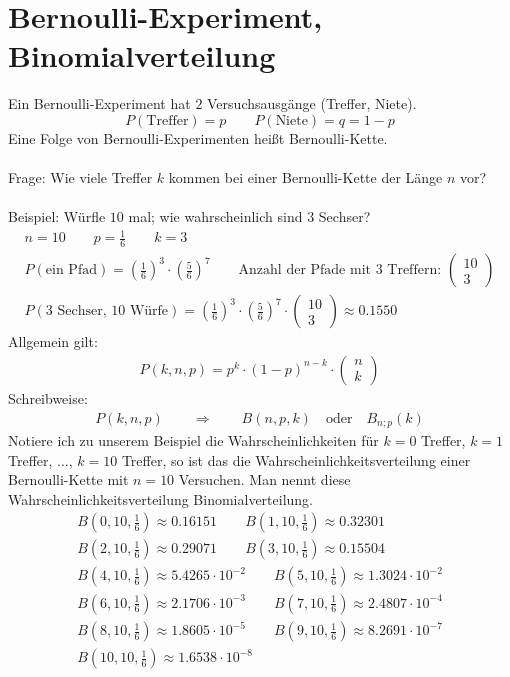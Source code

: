 \section{Bernoulli-Experiment, Binomialverteilung}
Ein Bernoulli-Experiment hat $2$ Versuchsausgänge (Treffer, Niete).
$$P(\text{Treffer}) = p \qquad P(\text{Niete}) = q = 1 - p$$
Eine Folge von Bernoulli-Experimenten heißt Bernoulli-Kette. \\\\
Frage: Wie viele Treffer $k$ kommen bei einer Bernoulli-Kette der Länge $n$ vor? \\\\
Beispiel: Würfle $10$ mal; wie wahrscheinlich sind $3$ Sechser?
\begin{gather*}
  n = 10 \qquad p = \frac{1}{6} \qquad k = 3 \\
  P(\text{ein Pfad}) = (\frac{1}{6})^3 \cdot (\frac{5}{6})^7 \qquad \text{Anzahl der Pfade mit $3$ Treffern: } \begin{pmatrix}10 \\ 3\end{pmatrix} \\
  P(\text{$3$ Sechser, $10$ Würfe}) = (\frac{1}{6})^3 \cdot (\frac{5}{6})^7 \cdot \begin{pmatrix}10 \\ 3\end{pmatrix} \approx 0.1550
\end{gather*}
Allgemein gilt:
\begin{gather*}
  P(k, n, p) = p^k \cdot (1 - p)^{n - k} \cdot \begin{pmatrix}n \\ k\end{pmatrix}
\end{gather*}
Schreibweise:
\begin{gather*}
  P(k, n, p) \qquad\Rightarrow\qquad B(n, p, k) \quad\text{oder}\quad B_{n; p}(k)
\end{gather*}
Notiere ich zu unserem Beispiel die Wahrscheinlichkeiten für $k = 0$ Treffer, $k = 1$ Treffer, ..., $k = 10$ Treffer, so ist das die Wahrscheinlichkeitsverteilung einer Bernoulli-Kette mit $n = 10$ Versuchen. Man nennt diese Wahrscheinlichkeitsverteilung Binomialverteilung. \\
\begin{gather*}
  B(0, 10, \frac{1}{6}) \approx 0.16151 \qquad B(1, 10, \frac{1}{6}) \approx 0.32301 \\
  B(2, 10, \frac{1}{6}) \approx 0.29071 \qquad B(3, 10, \frac{1}{6}) \approx 0.15504 \\
  B(4, 10, \frac{1}{6}) \approx 5.4265 \cdot 10^{-2} \qquad B(5, 10, \frac{1}{6}) \approx 1.3024 \cdot 10^{-2} \\
  B(6, 10, \frac{1}{6}) \approx 2.1706 \cdot 10^{-3} \qquad B(7, 10, \frac{1}{6}) \approx 2.4807 \cdot 10^{-4} \\
  B(8, 10, \frac{1}{6}) \approx 1.8605 \cdot 10^{-5} \qquad B(9, 10, \frac{1}{6}) \approx 8.2691 \cdot 10^{-7} \\
  B(10, 10, \frac{1}{6}) \approx 1.6538 \cdot 10^{-8}
\end{gather*}
